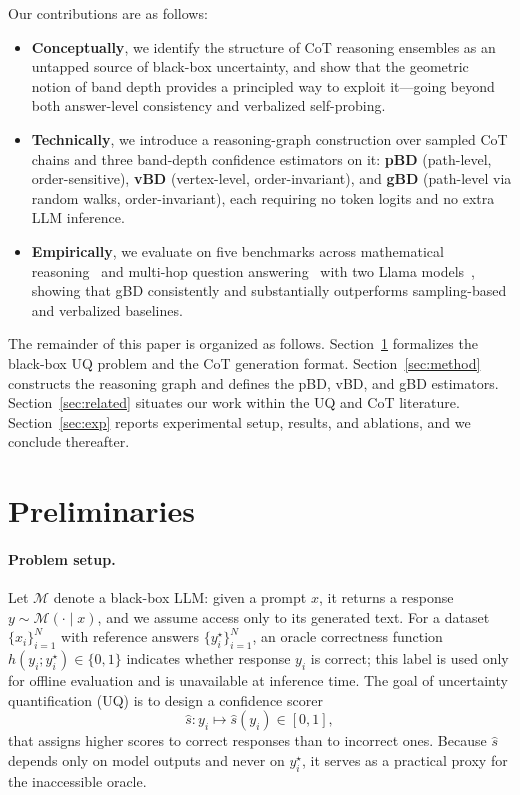 \documentclass[11pt]{article}
\begin{document}
Our contributions are as follows:
\begin{itemize}
  \item \textbf{Conceptually}, we identify the structure of CoT reasoning
        ensembles as an untapped source of black-box uncertainty, and show that
        the geometric notion of band depth provides a principled way to exploit
        it---going beyond both answer-level consistency and verbalized
        self-probing.
  \item \textbf{Technically}, we introduce a reasoning-graph construction over
        sampled CoT chains and three band-depth confidence estimators on it:
        \textbf{pBD} (path-level, order-sensitive), \textbf{vBD} (vertex-level,
        order-invariant), and \textbf{gBD} (path-level via random walks,
        order-invariant), each requiring no token logits and no extra LLM
        inference.
  \item \textbf{Empirically}, we evaluate on five benchmarks across mathematical
        reasoning~\citep{cobbe2021gsm8k, patel2021svamp, miao2020asdiv} and
        multi-hop question answering~\citep{yang2018hotpotqa, ho2020wikimultihop}
        with two Llama models~\citep{touvron2023llama2, grattafiori2024llama3},
        showing that gBD consistently and substantially outperforms
        sampling-based and verbalized baselines.
\end{itemize}

The remainder of this paper is organized as follows. Section~\ref{sec:prelim}
formalizes the black-box UQ problem and the CoT generation format.
Section~\ref{sec:method} constructs the reasoning graph and defines the pBD,
vBD, and gBD estimators. Section~\ref{sec:related} situates our work within the
UQ and CoT literature. Section~\ref{sec:exp} reports experimental setup,
results, and ablations, and we conclude thereafter.

\section{Preliminaries}
\label{sec:prelim}

\paragraph{Problem setup.}
Let $\mathcal{M}$ denote a black-box LLM: given a prompt $x$, it returns a
response $y \sim \mathcal{M}(\cdot \mid x)$, and we assume access only to its
generated text. For a dataset
$\{x_i\}_{i=1}^{N}$ with reference answers $\{y_i^\star\}_{i=1}^{N}$, an oracle
correctness function $h(y_i; y_i^\star) \in \{0, 1\}$ indicates whether response
$y_i$ is correct; this label is used only for offline evaluation and is
unavailable at inference time. The goal of uncertainty quantification (UQ) is to design a confidence scorer
\begin{equation}
  \hat{s}: y_i \mapsto \hat{s}(y_i)\in[0,1],
\end{equation}
that assigns higher scores to correct responses than to incorrect ones.
Because $\hat{s}$ depends only on model outputs and never on $y_i^\star$, it
serves as a practical proxy for the inaccessible oracle.
\end{document}
